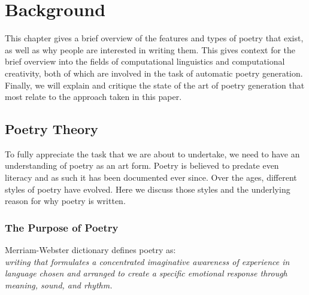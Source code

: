 
\chapter{Background}
\ifpdf
    \graphicspath{{Design/DesignFigs/PNG/}{Design/DesignFigs/PDF/}{Design/DesignFigs/}}
\else
    \graphicspath{{Design/DesignFigs/EPS/}{Design/DesignFigs/}}
\fi

This chapter gives a brief overview of the features and types of poetry that exist, as well as why people are interested in writing them. This gives context for the brief overview into the fields of computational linguistics and computational creativity, both of which are involved in the task of automatic poetry generation. Finally, we will explain and critique the state of the art of poetry generation that most relate to the approach taken in this paper.

\section{Poetry Theory}

To fully appreciate the task that we are about to undertake, we need to have an understanding of poetry as an art form. Poetry is believed to predate even literacy and as such it has been documented ever since. Over the ages, different styles of poetry have evolved. Here we discuss those styles and the underlying reason for why poetry is written.

\subsection{The Purpose of Poetry}

Merriam-Webster dictionary defines poetry as:\\
\emph{writing that formulates a concentrated imaginative awareness of experience in language chosen and arranged to create a specific emotional response through meaning, sound, and rhythm.}\\


